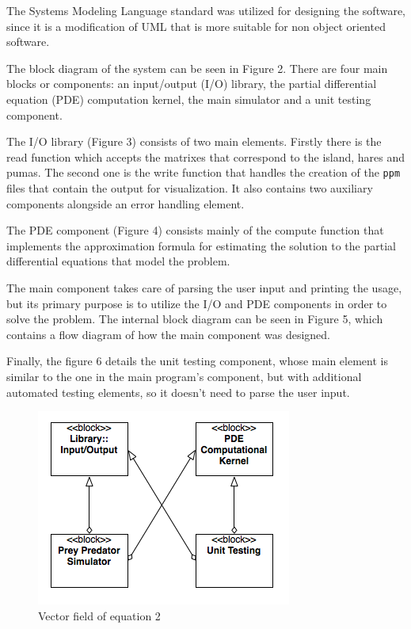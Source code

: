 \documentclass[12pt,a4paper]{article}
\begin{document}
The Systems Modeling Language standard was utilized for designing the software, since it is a modification of UML that is more suitable for non object oriented software. 

The block diagram of the system can be seen in Figure 2. There are four main blocks or components: an input/output (I/O) library, the partial differential equation (PDE) computation kernel, the main simulator and a unit testing component.

The I/O library (Figure 3) consists of two main elements. Firstly there is the read function which accepts the matrixes that correspond to the island, hares and pumas. The second one is the write function that handles the creation of the \texttt{ppm} files that contain the output for visualization. It also contains two auxiliary components alongside an error handling element.

The PDE component (Figure 4) consists mainly of the compute function that implements the approximation formula for estimating the solution to the partial differential equations that model the problem.

The main component takes care of parsing the user input and printing the usage, but its primary purpose is to utilize the I/O and PDE components in order to solve the problem. The internal block diagram can be seen in Figure 5, which contains a flow diagram of how the main component was designed.

Finally, the figure 6 details the unit testing component, whose main element is similar to the one in the main program's component, but with additional automated testing elements, so it doesn't need to parse the user input.


\begin{figure}[hb]
    \centering
    \includegraphics[scale=0.6]{images/blockdesign.png}
    \caption{Vector field of equation 2}
\end{figure}
\end{document}
